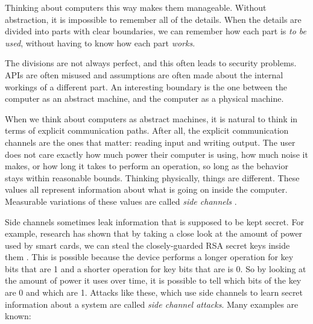 \documentclass{acm_proc_article-sp}
\begin{document}
Thinking about computers this way makes them manageable. Without abstraction, it
is impossible to remember all of the details. When the details are divided into
parts with clear boundaries, we can remember how each part is \emph{to be used},
without having to know how each part \emph{works}.

The divisions are not always perfect, and this often leads to security problems.
APIs are often misused and assumptions are often made about the internal
workings of a different part. An interesting boundary is the one between the
computer as an abstract machine, and the computer as a physical machine.

When we think about computers as abstract machines, it is natural to think in
terms of explicit communication paths. After all, the explicit communication
channels are the ones that matter: reading input and writing output. The user
does not care exactly how much power their computer is using, how much noise it
makes, or how long it takes to perform an operation, so long as the behavior
stays within reasonable bounds. Thinking physically, things are different. These
values all represent information about what is going on inside the computer.
Measurable variations of these values are called \emph{side channels}
\cite{kelsey1998side}.

Side channels sometimes leak information that is supposed to be kept secret. For
example, research has shown that by taking a close look at the amount of power
used by smart cards, we can steal the closely-guarded RSA secret keys inside
them \cite{messerges1999power}. This is possible because the device performs
a longer operation for key bits that are 1 and a shorter operation for key bits
that are is 0. So by looking at the amount of power it uses over time, it is
possible to tell which bits of the key are 0 and which are 1. Attacks like
these, which use side channels to learn secret information about a system are
called \emph{side channel attacks}. Many examples are known:
\end{document}
